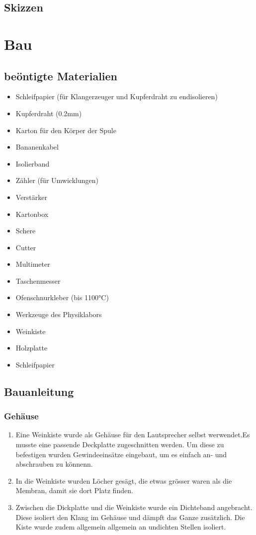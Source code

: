 \documentclass[a4paper,11pt]{report}
\begin{document}
\section{Skizzen}

\chapter{Bau}
\section{beöntigte Materialien}
\begin{multicols}{2}
    \begin{itemize}[parsep=0pt]
        \item Schleifpapier (für Klangerzeuger und Kupferdraht zu endisolieren)
        \item Kupferdraht (0.2mm)
        \item Karton für den Körper der Spule
        \item Bananenkabel
        \item Isolierband
        \item Zähler (für Umwicklungen)
        \item Verstärker
        \item Kartonbox
        \item Schere
        \item Cutter
        \item Multimeter
        \item Taschenmesser
        \item Ofenschnurkleber (bis 1100°C)
        \item Werkzeuge des Physiklabors
        \item Weinkiste
        \item Holzplatte
        \item Schleifpapier
    \end{itemize}
\end{multicols}
\section{Bauanleitung}
\subsection{Gehäuse}
\begin{enumerate}
    \item Eine Weinkiste wurde als Gehäuse für den Lautsprecher selbst werwendet.Es musste eine passende Deckplatte zugeschnitten werden. Um diese zu befestigen wurden Gewindeeinsätze eingebaut, um es einfach an- und abschrauben zu könnenn.
    \item In die Weinkiste wurden Löcher gesägt, die etwas grösser waren als die Membran, damit sie dort Platz finden.
    \item Zwischen die Dickplatte und die Weinkiste wurde ein Dichteband angebracht. Diese isoliert den Klang im Gehäuse und dämpft das Ganze zusätzlich.
    Die Kiste wurde zudem allgemein allgemein an undichten Stellen isoliert. 
\end{enumerate}
\end{document}
